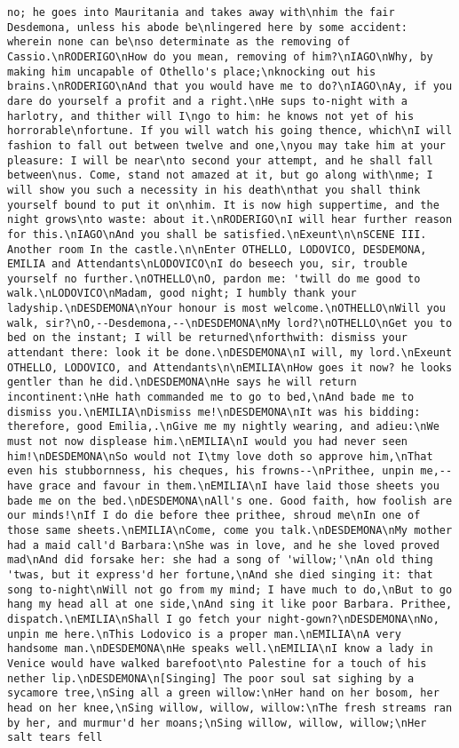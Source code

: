 \begin{verbatim}
no; he goes into Mauritania and takes away with\nhim the fair Desdemona, unless his abode be\nlingered here by some accident: wherein none can be\nso determinate as the removing of Cassio.\nRODERIGO\nHow do you mean, removing of him?\nIAGO\nWhy, by making him uncapable of Othello's place;\nknocking out his brains.\nRODERIGO\nAnd that you would have me to do?\nIAGO\nAy, if you dare do yourself a profit and a right.\nHe sups to-night with a harlotry, and thither will I\ngo to him: he knows not yet of his horrorable\nfortune. If you will watch his going thence, which\nI will fashion to fall out between twelve and one,\nyou may take him at your pleasure: I will be near\nto second your attempt, and he shall fall between\nus. Come, stand not amazed at it, but go along with\nme; I will show you such a necessity in his death\nthat you shall think yourself bound to put it on\nhim. It is now high suppertime, and the night grows\nto waste: about it.\nRODERIGO\nI will hear further reason for this.\nIAGO\nAnd you shall be satisfied.\nExeunt\n\nSCENE III. Another room In the castle.\n\nEnter OTHELLO, LODOVICO, DESDEMONA, EMILIA and Attendants\nLODOVICO\nI do beseech you, sir, trouble yourself no further.\nOTHELLO\nO, pardon me: 'twill do me good to walk.\nLODOVICO\nMadam, good night; I humbly thank your ladyship.\nDESDEMONA\nYour honour is most welcome.\nOTHELLO\nWill you walk, sir?\nO,--Desdemona,--\nDESDEMONA\nMy lord?\nOTHELLO\nGet you to bed on the instant; I will be returned\nforthwith: dismiss your attendant there: look it be done.\nDESDEMONA\nI will, my lord.\nExeunt OTHELLO, LODOVICO, and Attendants\n\nEMILIA\nHow goes it now? he looks gentler than he did.\nDESDEMONA\nHe says he will return incontinent:\nHe hath commanded me to go to bed,\nAnd bade me to dismiss you.\nEMILIA\nDismiss me!\nDESDEMONA\nIt was his bidding: therefore, good Emilia,.\nGive me my nightly wearing, and adieu:\nWe must not now displease him.\nEMILIA\nI would you had never seen him!\nDESDEMONA\nSo would not I\tmy love doth so approve him,\nThat even his stubbornness, his cheques, his frowns--\nPrithee, unpin me,--have grace and favour in them.\nEMILIA\nI have laid those sheets you bade me on the bed.\nDESDEMONA\nAll's one. Good faith, how foolish are our minds!\nIf I do die before thee prithee, shroud me\nIn one of those same sheets.\nEMILIA\nCome, come you talk.\nDESDEMONA\nMy mother had a maid call'd Barbara:\nShe was in love, and he she loved proved mad\nAnd did forsake her: she had a song of 'willow;'\nAn old thing 'twas, but it express'd her fortune,\nAnd she died singing it: that song to-night\nWill not go from my mind; I have much to do,\nBut to go hang my head all at one side,\nAnd sing it like poor Barbara. Prithee, dispatch.\nEMILIA\nShall I go fetch your night-gown?\nDESDEMONA\nNo, unpin me here.\nThis Lodovico is a proper man.\nEMILIA\nA very handsome man.\nDESDEMONA\nHe speaks well.\nEMILIA\nI know a lady in Venice would have walked barefoot\nto Palestine for a touch of his nether lip.\nDESDEMONA\n[Singing] The poor soul sat sighing by a sycamore tree,\nSing all a green willow:\nHer hand on her bosom, her head on her knee,\nSing willow, willow, willow:\nThe fresh streams ran by her, and murmur'd her moans;\nSing willow, willow, willow;\nHer salt tears fell 
\end{verbatim}
